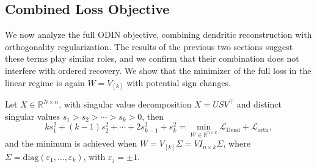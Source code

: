 \documentclass[twoside,11pt]{article}
\begin{document}
\subsection{Combined Loss Objective}
\label{subsec:combined}

We now analyze the full ODIN objective, combining dendritic reconstruction with orthogonality regularization. The results of the previous two sections suggest these terms play similar roles, and we confirm that their combination does not interfere with ordered recovery. We show that the minimizer of the full loss in the linear regime is again $W = V_{[k]}$ with potential sign changes.
\begin{theorem}
    Let $X \in \mathbb{R}^{N \times n}$, with singular value decomposition $X=USV^\top$ and distinct singular values $s_1>s_2>\cdots>s_k>0$, then 
    \[ k s_1^2 + (k-1)s_2^2 + \cdots + 2 s_{k-1}^2 + s_k^2 = \min_{W \in \mathbb{R}^{n \times k}}  \mathcal{L}_{\text{Dend}}+ \mathcal{L}_{\text{orth}}, \]
    and the minimum is achieved when $W=V_{[k]}\Sigma=VI_{n\times k}\Sigma$, where $\Sigma = \mathrm{diag}(\varepsilon_1, \dots, \varepsilon_k)$, with $\varepsilon_j = \pm 1$.
\end{theorem}
\end{document}
